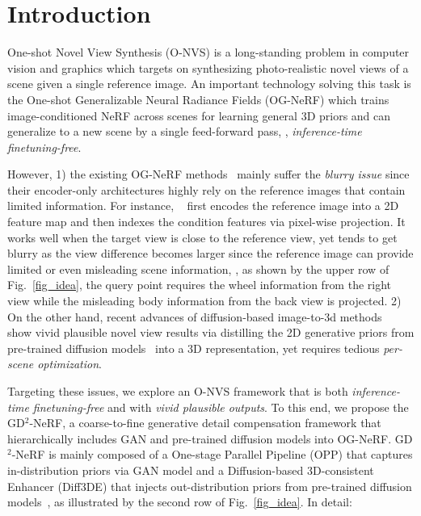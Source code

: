 
\section{\textbf{Introduction}}
\label{sec:intro}


One-shot Novel View Synthesis (O-NVS) is a long-standing problem in computer vision and graphics which targets on synthesizing photo-realistic novel views of a scene given a single reference image. An important technology solving this task is the One-shot Generalizable Neural Radiance Fields (OG-NeRF) which trains image-conditioned NeRF across scenes for learning general 3D priors and can generalize to a new scene by a single feed-forward pass, \ie, \textit{inference-time finetuning-free}.

However, 1) the existing OG-NeRF methods~\cite{PixelNeRF_yu2021pixelnerf,lin2023visionnerf,FE_NVS_guo2022fast} mainly suffer the \textit{blurry issue} since their encoder-only architectures highly rely on the reference images that contain limited information. 
For instance, ~\cite{PixelNeRF_yu2021pixelnerf,lin2023visionnerf} first encodes the reference image into a 2D feature map and then indexes the condition features via pixel-wise projection. It works well when the target view is close to the reference view, yet tends to get blurry as the view difference becomes larger since the reference image can provide limited or even misleading scene information, \eg, as shown by the upper row of Fig.~\ref{fig_idea}, the query point requires the wheel information from the right view while the misleading body information from the back view is projected. 2) On the other hand, recent advances of diffusion-based image-to-3d methods~\cite{liu2023zero123,tang2023makeit3d} show vivid plausible novel view results via distilling the 2D generative priors from pre-trained diffusion models~\cite{rombach2022LatentDiff,zhang2023addingControlNet} into a 3D representation, yet requires tedious \textit{per-scene optimization}.




Targeting these issues, we explore an O-NVS framework that is both \textit{inference-time finetuning-free }and with \textit{vivid plausible outputs}. To this end, we propose the GD$^2$-NeRF, a coarse-to-fine generative detail compensation framework that hierarchically includes GAN and pre-trained diffusion models into OG-NeRF. GD$^2$-NeRF is mainly composed of a {One-stage Parallel Pipeline (OPP)} that captures in-distribution priors via GAN model and a {Diffusion-based 3D-consistent Enhancer (Diff3DE)} that injects out-distribution priors from pre-trained diffusion models~\cite{rombach2022LatentDiff,zhang2023addingControlNet}, as illustrated by the second row of Fig.~\ref{fig_idea}. In detail: 



